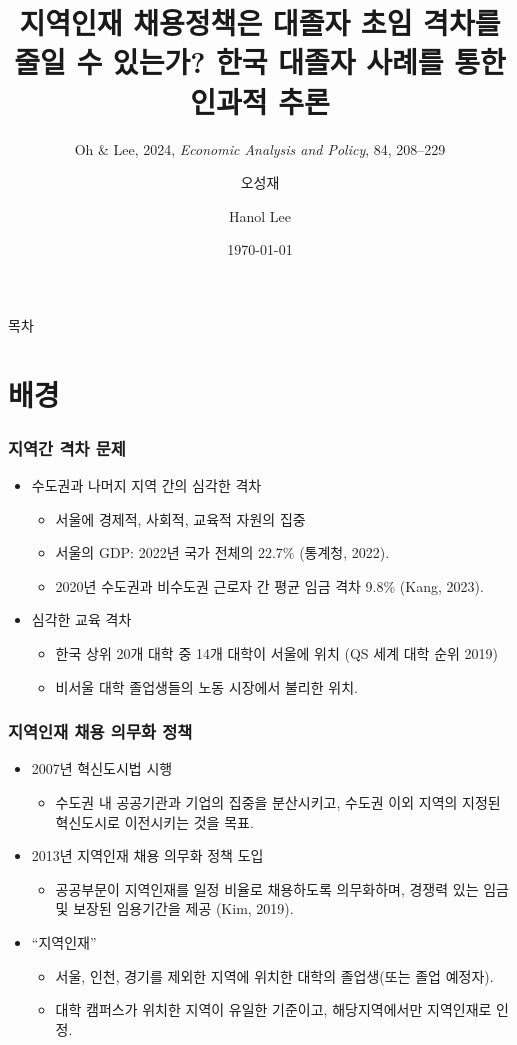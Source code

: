 \documentclass[aspectratio=169,xcolor=dvipsnames,handout]{beamer}
\title{지역인재 채용정책은 대졸자 초임 격차를 줄일 수 있는가? 한국 대졸자 사례를 통한 인과적 추론}
\subtitle{Oh \& Lee, 2024, \textit{Economic Analysis and Policy}, 84, 208–229}
\author[Oh \& Lee]{오성재\inst{1} \and Hanol Lee\inst{2}}
\institute[CNU / SUFE]
{%
  \inst{1}
  충남대학교\\
  \inst{2}
  Southwestern University of Finance and Economics, China\\
  한국보건사회연구원
}
\date[Nov, 2024]{\today}
\begin{document}

\frame{\titlepage}

\begin{frame}{목차}
    \small
    \tableofcontents[hideallsubsections]
\end{frame}

\section{배경}
\begin{frame}
    \frametitle{지역간 격차 문제}
    \begin{itemize}[<+->]
        \item 수도권과 나머지 지역 간의 심각한 격차
        \begin{itemize}[<+->]
            \item 서울에 경제적, 사회적, 교육적 자원의 집중
            \item 서울의 GDP\@: 2022년 국가 전체의 22.7\% (통계청, 2022).
            \item 2020년 수도권과 비수도권 근로자 간 평균 임금 격차 9.8\% (Kang, 2023).
        \end{itemize}
        \item 심각한 교육 격차
        \begin{itemize}[<+->]
            \item 한국 상위 20개 대학 중 14개 대학이 서울에 위치 (QS 세계 대학 순위 2019)
            \item 비서울 대학 졸업생들의 노동 시장에서 불리한 위치.
        \end{itemize}
    \end{itemize}
\end{frame}

\begin{frame}
    \frametitle{지역인재 채용 의무화 정책}
    \begin{itemize}[<+->]
        \item 2007년 혁신도시법 시행
        \begin{itemize}[<+->]
            \item 수도권 내 공공기관과 기업의 집중을 분산시키고, 수도권 이외 지역의 지정된 혁신도시로 이전시키는 것을 목표.
        \end{itemize}
        \item 2013년 지역인재 채용 의무화 정책 도입
        \begin{itemize}[<+->]
            \item 공공부문이 지역인재를 일정 비율로 채용하도록 의무화하며, 경쟁력 있는 임금 및 보장된 임용기간을 제공 (Kim, 2019).
        \end{itemize}
        \item ``지역인재''
        \begin{itemize}[<+->]
            \item 서울, 인천, 경기를 제외한 지역에 위치한 대학의 졸업생(또는 졸업 예정자).
            \item 대학 캠퍼스가 위치한 지역이 유일한 기준이고, 해당지역에서만 지역인재로 인정.
        \end{itemize}
    \end{itemize}
\end{frame}
\end{document}
